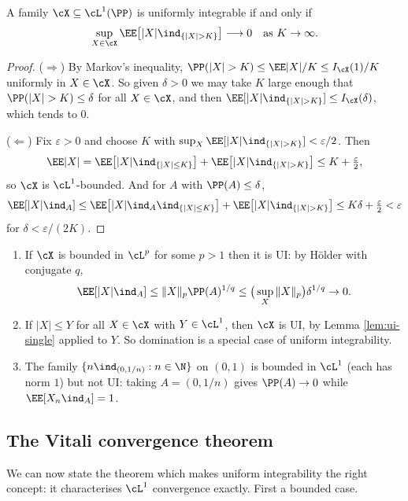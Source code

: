 \begin{lemma}\label{lem:ui-equiv}
	A family $\cX\subseteq\cL^1(\PP)$ is uniformly integrable if and only if
	$$
	\sup_{X\in\cX}\EE\big[|X|\ind_{\{|X|>K\}}\big] \longrightarrow 0 \quad \text{as } K \to \infty.
	$$
\end{lemma}
\begin{proof}
	($\Rightarrow$) By Markov's inequality, $\PP(|X|>K)\leq \EE|X|/K \leq I_\cX(1)/K$ uniformly in $X\in\cX$. So given $\delta>0$ we may take $K$ large enough that $\PP(|X|>K)\leq\delta$ for all $X \in \cX$, and then $\EE[|X|\ind_{\{|X|>K\}}]\leq I_\cX(\delta)$, which tends to $0$.

	($\Leftarrow$) Fix $\varepsilon>0$ and choose $K$ with $\sup_{X}\EE[|X|\ind_{\{|X|>K\}}]<\varepsilon/2$. Then
	$$
	\EE|X| = \EE\big[|X|\ind_{\{|X|\leq K\}}\big]+\EE\big[|X|\ind_{\{|X|>K\}}\big] \leq K + \tfrac\varepsilon2,
	$$
	so $\cX$ is $\cL^1$-bounded. And for $A$ with $\PP(A)\leq\delta$,
	$$
	\EE[|X|\ind_A] \leq \EE\big[|X|\ind_A\ind_{\{|X|\leq K\}}\big]+\EE\big[|X|\ind_{\{|X|>K\}}\big] \leq K\delta+\tfrac\varepsilon2 < \varepsilon
	$$
	for $\delta < \varepsilon/(2K)$.
\end{proof}

\begin{example}
	\begin{enumerate}[label=(\roman*)]
		\item If $\cX$ is bounded in $\cL^p$ for some $p>1$ then it is UI: by H\"older with conjugate $q$,
		$$
		\EE[|X|\ind_A] \leq \|X\|_p \PP(A)^{1/q} \leq \big(\sup_X\|X\|_p\big)\delta^{1/q}\to0.
		$$
		\item If $|X| \leq Y$ for all $X \in \cX$ with $Y \in\cL^1$, then $\cX$ is UI, by Lemma \ref{lem:ui-single} applied to $Y$. So domination is a special case of uniform integrability.
		\item The family $\{n\ind_{(0,1/n)} : n\in\N\}$ on $(0,1)$ is bounded in $\cL^1$ (each has norm $1$) but not UI: taking $A = (0,1/n)$ gives $\PP(A)\to0$ while $\EE[X_n \ind_A]=1$.
	\end{enumerate}
\end{example}

\subsection{The Vitali convergence theorem}

We can now state the theorem which makes uniform integrability the right concept: it characterises $\cL^1$ convergence exactly. First a bounded case.

